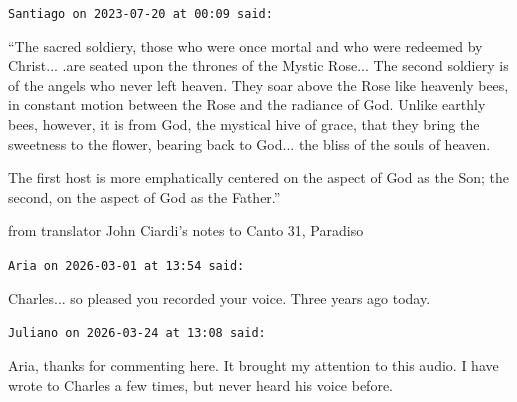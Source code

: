 \begin{footnotesize}
\begin{sffamily}
\texttt{Santiago on 2023-07-20 at 00:09 said:}

``The sacred soldiery, those who were once mortal and who were redeemed by Christ... .are seated upon the thrones of the Mystic Rose... The second soldiery is of the angels who never left heaven. They soar above the Rose like heavenly bees, in constant motion between the Rose and the radiance of God. Unlike earthly bees, however, it is from God, the mystical hive of grace, that they bring the sweetness to the flower, bearing back to God... the bliss of the souls of heaven.

The first host is more emphatically centered on the aspect of God as the Son; the second, on the aspect of God as the Father.''

from translator John Ciardi's notes to Canto 31, Paradiso

\hfill

\texttt{Aria on 2026-03-01 at 13:54 said:}

Charles... so pleased you recorded your voice. Three years ago today.

\hfill

\texttt{Juliano on 2026-03-24 at 13:08 said:}

Aria, thanks for commenting here. It brought my attention to this audio. I have wrote to Charles a few times, but never heard his voice before.


\hfill

\end{sffamily}
\end{footnotesize}


